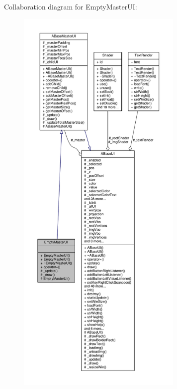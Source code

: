 Collaboration diagram for Empty\+Master\+UI\+:
\nopagebreak
\begin{figure}[H]
\begin{center}
\leavevmode
\includegraphics[height=550pt]{class_empty_master_u_i__coll__graph}
\end{center}
\end{figure}
